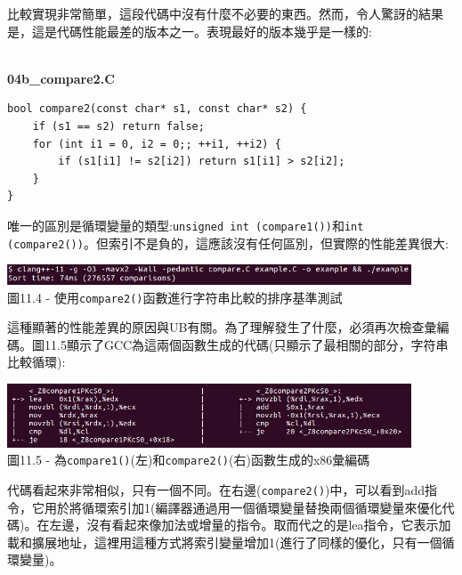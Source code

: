 比較實現非常簡單，這段代碼中沒有什麼不必要的東西。然而，令人驚訝的結果是，這是代碼性能最差的版本之一。表現最好的版本幾乎是一樣的:

\hspace*{\fill} \\ %
\noindent
\textbf{04b\_compare2.C}
\begin{lstlisting}[style=styleCXX]
bool compare2(const char* s1, const char* s2) {
	if (s1 == s2) return false;
	for (int i1 = 0, i2 = 0;; ++i1, ++i2) {
		if (s1[i1] != s2[i2]) return s1[i1] > s2[i2];
	}
}
\end{lstlisting}

唯一的區別是循環變量的類型:\texttt{unsigned int (compare1())}和\texttt{int (compare2())}。但索引不是負的，這應該沒有任何區別，但實際的性能差異很大:

\begin{center}
\includegraphics[width=0.9\textwidth]{content/3/chapter11/images/4.jpg}\\
圖11.4 - 使用\texttt{compare2()}函數進行字符串比較的排序基準測試
\end{center}

這種顯著的性能差異的原因與UB有關。為了理解發生了什麼，必須再次檢查彙編碼。圖11.5顯示了GCC為這兩個函數生成的代碼(只顯示了最相關的部分，字符串比較循環):

\begin{center}
\includegraphics[width=0.9\textwidth]{content/3/chapter11/images/5.jpg}\\
圖11.5 - 為\texttt{compare1()}(左)和\texttt{compare2()}(右)函數生成的x86彙編碼
\end{center}

代碼看起來非常相似，只有一個不同。在右邊(\texttt{compare2()})中，可以看到add指令，它用於將循環索引加1(編譯器通過用一個循環變量替換兩個循環變量來優化代碼)。在左邊，沒有看起來像加法或增量的指令。取而代之的是lea指令，它表示加載和擴展地址，這裡用這種方式將索引變量增加1(進行了同樣的優化，只有一個循環變量)。 

